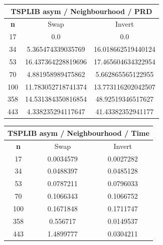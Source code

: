 \documentclass{article}
\begin{document}
\begin{center}
\begin{tabular}{|c|c|c|}
\hline
\multicolumn{3}{|c|}{\textbf{TSPLIB asym / Neighbourhood / PRD}}\\
\hline
\textbf{n} & Swap & Invert\\
\hline
17 & 0.0 & 0.0\\
\hline
34 & 5.365474339035769 & 16.018662519440124\\
\hline
53 & 16.437364228819696 & 17.465604634322954\\
\hline
70 & 4.881958989475862 & 5.662865565122955\\
\hline
100 & 11.783052718741374 & 13.773116202042507\\
\hline
358 & 14.531384350816854 & 48.92519346517627\\
\hline
443 & 4.338235294117647 & 41.43382352941177\\
\hline
\end{tabular}
\end{center}


\begin{center}
\begin{tabular}{|c|c|c|}
\hline
\multicolumn{3}{|c|}{\textbf{TSPLIB asym / Neighbourhood / Time}}\\
\hline
\textbf{n} & Swap & Invert\\
\hline
17 & 0.0034579 & 0.0027282\\
\hline
34 & 0.0488397 & 0.0485128\\
\hline
53 & 0.0787211 & 0.0796033\\
\hline
70 & 0.1066343 & 0.1066752\\
\hline
100 & 0.1671848 & 0.1711747\\
\hline
358 & 0.556717 & 0.0149537\\
\hline
443 & 1.4899777 & 0.0304211\\
\hline
\end{tabular}
\end{center}
\end{document}
